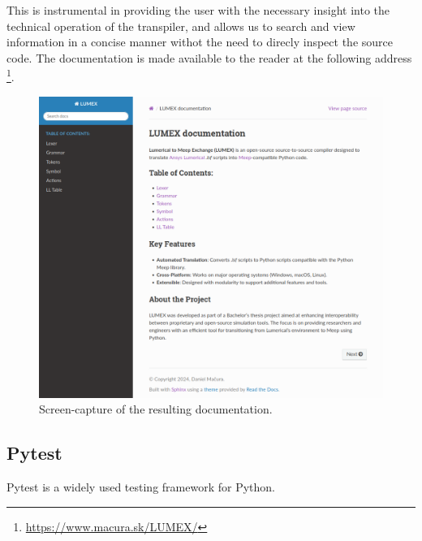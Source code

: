 This is instrumental in providing the user with the necessary insight into the technical operation of the transpiler, and allows us to search and view information in a concise manner withot the need to direcly inspect the source code. The documentation is made available to the reader at the following address \footnote{\url{https://www.macura.sk/LUMEX/}}.

\begin{figure}[H]\label{fig:shpinx}
  \centering
  \includegraphics[width=\textwidth]{obrazky-figures/sphinx-lumex.png}
  \caption{Screen-capture of the resulting documentation.}
\end{figure}

\subsection{Pytest}
Pytest is a widely used testing framework for Python. 


